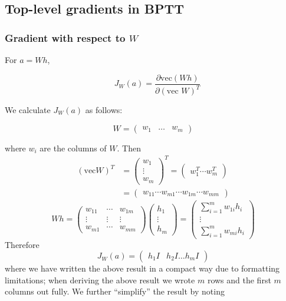 \subsection{Top-level gradients in BPTT}

\subsubsection{Gradient with respect to $W$}

For $a = Wh$,

\begin{equation*}
\quad J_{W}(a) = \frac{\partial \mbox{vec}(Wh)}{\partial (\mbox{vec } W)^T}
\end{equation*}

We calculate $J_{W}(a)$ as follows:

\begin{equation*}
W = \begin{pmatrix} w_1 & \ldots & w_m \end{pmatrix}
\end{equation*}

where $w_i$ are the columns of $W$. Then
%
\begin{align*}
  (\mbox{vec} W)^T & = \begin{pmatrix}w_1 \\ \vdots \\ w_m \end{pmatrix}^T = \begin{pmatrix}w_1^T \cdots w_m^T \end{pmatrix} \\
  & = \begin{pmatrix} w_{11} \cdots w_{m1} \cdots w_{1m} \cdots w_{mm} \end{pmatrix}
\end{align*}
%
\begin{equation*}
  Wh = \begin{pmatrix}
    w_{11} & \cdots & w_{1m} \\
    \vdots & \vdots & \vdots \\
    w_{m1} & \cdots & w_{mm}
  \end{pmatrix} \begin{pmatrix}
    h_1 \\ \vdots \\ h_m
  \end{pmatrix} = \begin{pmatrix}
    \sum_{i=1}^m w_{1i} h_i \\
    \vdots \\
    \sum_{i=1}^m w_{mi} h_i
  \end{pmatrix}
\end{equation*}
%
Therefore
%
\begin{equation*}
  J_W(a) = \begin{pmatrix}
    h_1 I & h_2 I \ldots h_m I
  \end{pmatrix}
\end{equation*}
%
where we have written the above result in a compact way due to formatting limitations; when deriving the above result we wrote $m$ rows and the first $m$ columns out fully. We further ``simplify'' the result by noting

